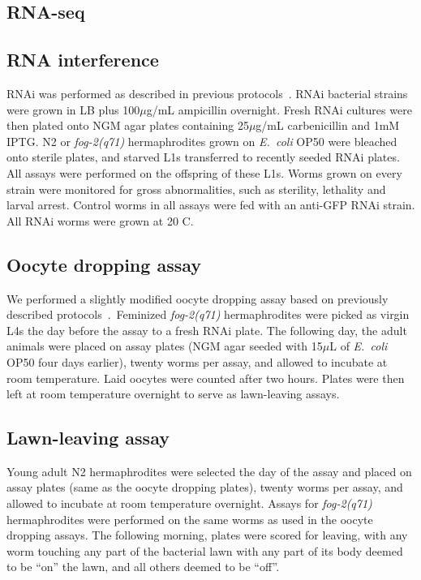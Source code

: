 \documentclass[9pt,twocolumn,twoside]{gsag3jnl}
\newcommand{\fog}{\emph{fog-2}}
\newcommand{\ecol}{\emph{E.~coli}}
\begin{document}
\subsection{RNA-seq}
\label{sb:rna_seq}

\subsection{RNA interference}
\label{sb:rnai}
RNAi was performed as described in previous protocols~\citep{}. RNAi bacterial strains were grown in LB plus 100$\mu$g/mL ampicillin overnight. Fresh RNAi cultures were then plated onto NGM agar plates containing 25$\mu$g/mL carbenicillin and 1mM IPTG. N2 or \fog{}\emph{(q71)} hermaphrodites grown on \ecol{} OP50 were bleached onto sterile plates, and starved L1s transferred to recently seeded RNAi plates.
All assays were performed on the offspring of these L1s. Worms grown on every strain were monitored for gross abnormalities, such as sterility, lethality and larval arrest. Control worms in all assays were fed with an anti-GFP RNAi strain. All RNAi worms were grown at 20\degree{} C.

\subsection{Oocyte dropping assay}
\label{sb:oocyte_assay}
We performed a slightly modified oocyte dropping assay based on previously described protocols~\citep{}.~Feminized \fog{}\emph{(q71)} hermaphrodites were picked as virgin L4s the day before the assay to a fresh RNAi plate. The following day, the adult animals were placed on assay plates (NGM agar seeded with 15$\mu$L of \ecol{} OP50 four days earlier), twenty worms per assay, and allowed to incubate at room temperature. Laid oocytes were counted after two hours. Plates were then left at room temperature overnight to serve as lawn-leaving assays.

\subsection{Lawn-leaving assay}
\label{sb:lawn_leaving}
Young adult N2 hermaphrodites were selected the day of the assay and placed on assay plates (same as the oocyte dropping plates), twenty worms per assay, and allowed to incubate at room temperature overnight. Assays for \fog{}\emph{(q71)} hermaphrodites were performed on the same worms as used in the oocyte dropping assays. The following morning, plates were scored for leaving, with any worm touching any part of the bacterial lawn with any part of its body deemed to be “on” the lawn, and all others deemed to be “off”.
\end{document}
